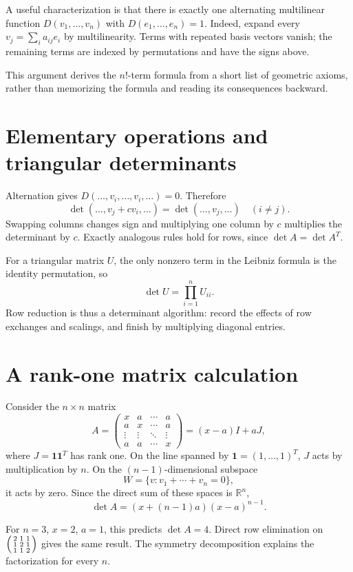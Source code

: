 A useful characterization is that there is exactly one alternating multilinear function \(D(v_1,\ldots,v_n)\) with \(D(e_1,\ldots,e_n)=1\). Indeed, expand every \(v_j=\sum_i a_{ij}e_i\) by multilinearity. Terms with repeated basis vectors vanish; the remaining terms are indexed by permutations and have the signs above.

This argument derives the \(n!\)-term formula from a short list of geometric axioms, rather than memorizing the formula and reading its consequences backward.

\section{Elementary operations and triangular determinants}

Alternation gives \(D(\ldots,v_i,\ldots,v_i,\ldots)=0\). Therefore
\[
 \det(\ldots,v_j+c v_i,\ldots)=\det(\ldots,v_j,\ldots)
 \quad(i\ne j).
\]
Swapping columns changes sign and multiplying one column by \(c\) multiplies the determinant by \(c\). Exactly analogous rules hold for rows, since \(\det A=\det A^T\).

For a triangular matrix \(U\), the only nonzero term in the Leibniz formula is the identity permutation, so
\[
 \det U=\prod_{i=1}^n U_{ii}.
\]
Row reduction is thus a determinant algorithm: record the effects of row exchanges and scalings, and finish by multiplying diagonal entries.

\section{A rank-one matrix calculation}

Consider the \(n\times n\) matrix
\[
 A=\begin{pmatrix}
 x&a&\cdots&a\\
 a&x&\cdots&a\\
 \vdots&\vdots&\ddots&\vdots\\
 a&a&\cdots&x
 \end{pmatrix}
 =(x-a)I+aJ,
\]
where \(J=\mathbf1\mathbf1^T\) has rank one. On the line spanned by \(\mathbf1=(1,\ldots,1)^T\), \(J\) acts by multiplication by \(n\). On the \((n-1)\)-dimensional subspace
\[
 W=\{v:v_1+\cdots+v_n=0\},
\]
it acts by zero. Since the direct sum of these spaces is \(\mathbb R^n\),
\[
 \boxed{\det A=(x+(n-1)a)(x-a)^{n-1}.}
\]

For \(n=3\), \(x=2\), \(a=1\), this predicts \(\det A=4\). Direct row elimination on
\(\begin{psmallmatrix}2&1&1\\1&2&1\\1&1&2\end{psmallmatrix}\)
gives the same result. The symmetry decomposition explains the factorization for every \(n\).

